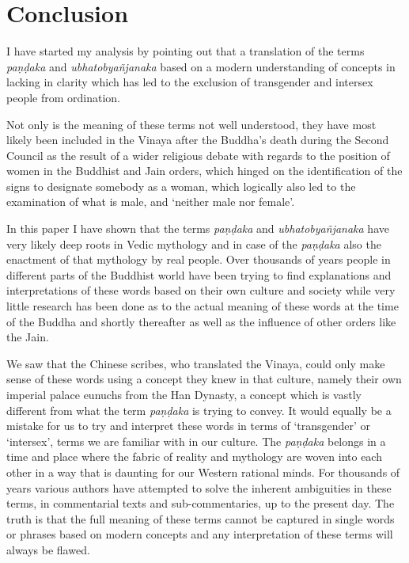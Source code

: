 \section{Conclusion}
I have started my analysis by pointing out that a translation of the terms {\em paṇḍaka} and {\em ubhatob­yañ­janaka} based on a modern understanding of concepts in lacking in clarity which has led to the exclusion of transgender and intersex people from ordination.

Not only is the meaning of these terms not well understood, they have most likely been included in the Vinaya after the Buddha's death during the Second Council as the result of a wider religious debate with regards to the position of women in the Buddhist and Jain orders, which hinged on the identification of the signs to designate somebody as a woman, which logically also led to the examination of what is male, and `neither male nor female'.

In this paper I have shown that the terms {\em paṇḍaka} and {\em ubhatob­yañ­janaka} have very likely deep roots in Vedic mythology and in case of the {\em paṇḍaka} also the enactment of that mythology by real people. Over thousands of years people in different parts of the Buddhist world have been trying to find explanations and interpretations of these words based on their own culture and society while very little research has been done as to the actual meaning of these words at the time of the Buddha and shortly thereafter as well as the influence of other orders like the Jain. 

We saw that the Chinese scribes, who translated the Vinaya, could only make sense of these words using a concept they knew in that culture, namely their own imperial palace eunuchs from the Han Dynasty, a concept which is vastly different from what the term {\em paṇḍaka} is trying to convey. It would equally be a mistake for us to try and interpret these words in terms of `transgender' or `intersex', terms we are familiar with in our culture. The {\em paṇḍaka} belongs in a time and place where the fabric of reality and mythology are woven into each other in a way that is daunting for our Western rational minds. For thousands of years various authors have attempted to solve the inherent ambiguities in these terms, in commentarial texts and sub-commentaries, up to the present day. The truth is that the full meaning of these terms cannot be captured in single words or phrases based on modern concepts and any interpretation of these terms will always be flawed.


